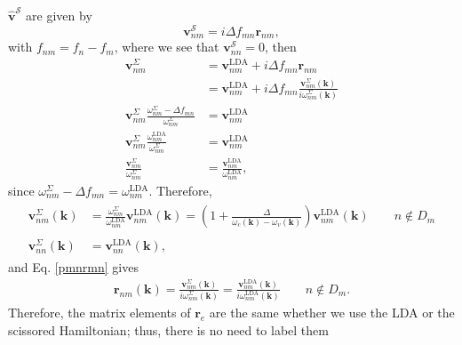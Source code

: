 $\hat{\mathbf{v}}^{\mathcal{S}}$ are given by
\begin{equation}\label{chon.2} 
\mathbf{v}^{\mathcal{S}}_{nm} = i\Delta f_{mn}\mathbf{r}_{nm},
\end{equation}
with $f_{nm} = f_{n} - f_{m}$, where we see that $\mathbf{v}^{\mathcal{S}}_{nn}
= 0$, then
\begin{align}\label{chon.8}
\mathbf{v}^\Sigma_{nm} 
&= \mathbf{v}^\mathrm{LDA}_{nm} + i\Delta f_{mn}\mathbf{r}_{nm}\nonumber\\
&= \mathbf{v}^\mathrm{LDA}_{nm} + i\Delta f_{mn}
   \frac{\mathbf{v}^\Sigma_{nm}(\mathbf{k})}{i\omega^\Sigma_{nm}(\mathbf{k})}
   \nonumber\\
\mathbf{v}^\Sigma_{nm}
  \frac{\omega^\Sigma_{nm}-\Delta f_{mn}}{\omega^\Sigma_{nm}}
&= \mathbf{v}^\mathrm{LDA}_{nm}\nonumber\\
\mathbf{v}^\Sigma_{nm}\frac{\omega^{\mathrm{LDA}}_{nm}}{\omega^\Sigma_{nm}}
&= \mathbf{v}^\mathrm{LDA}_{nm}\nonumber\\
\frac{\mathbf{v}^\Sigma_{nm}}{\omega^\Sigma_{nm}}
&= \frac{\mathbf{v}^\mathrm{LDA}_{nm}}{\omega^{\mathrm{LDA}}_{nm}},
\end{align}
since $\omega^\Sigma_{nm}-\Delta f_{mn}=\omega^{\mathrm{LDA}}_{nm}$. Therefore,
\begin{align}\label{chon.9}
\begin{split}
\mathbf{v}^\Sigma_{nm}(\mathbf{k}) &=
\frac{\omega^\Sigma_{nm}}{\omega^{\mathrm{LDA}}_{nm}}
\mathbf{v}^\mathrm{LDA}_{nm}(\mathbf{k})
= \left(
1 + \frac{\Delta}{\omega_c(\mathbf{k})-\omega_v(\mathbf{k})}
\right)
\mathbf{v}^\mathrm{LDA}_{nm}(\mathbf{k})\qquad n\notin D_{m}\\\\
\mathbf{v}^\Sigma_{nn}(\mathbf{k}) &= \mathbf{v}^\mathrm{LDA}_{nn}(\mathbf{k}),
\end{split}
\end{align} 
and Eq. \eqref{pmnrmn} gives
\begin{align}\label{chon.10}
\mathbf{r}_{nm}(\mathbf{k})
= \frac{\mathbf{v}^\Sigma_{nm}(\mathbf{k})}{i\omega^\Sigma_{nm}(\mathbf{k})}
= \frac{\mathbf{v}^\mathrm{LDA}_{nm}(\mathbf{k})}
{i\omega^{\mathrm{LDA}}_{nm}(\mathbf{k})} \qquad n\notin D_{m}.
\end{align}
Therefore, the matrix elements of $\mathbf{r}_{e}$ are the same whether we use
the LDA or the scissored Hamiltonian; thus, there is no need to label them
